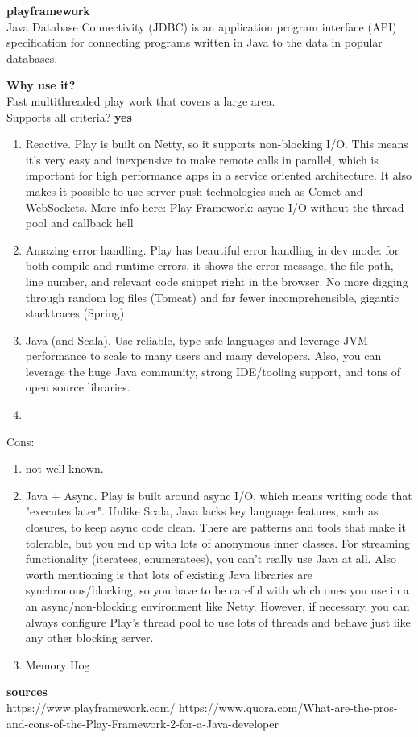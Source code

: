 
\textbf{playframework} \\
Java Database Connectivity (JDBC) is an application program interface (API) specification for connecting programs written in Java to the data in popular databases.

\textbf{Why use it?} \\
Fast multithreaded play work that covers a large area.\\

Supports all criteria?
\textbf{yes}

\begin{enumerate}
	\item Reactive. Play is built on Netty, so it supports non-blocking I/O. This means it's very easy and inexpensive to make remote calls in parallel, which is important for high performance apps in a service oriented architecture. It also makes it possible to use server push technologies such as Comet and WebSockets. More info here: Play Framework: async I/O without the thread pool and callback hell 
	\item Amazing error handling. Play has beautiful error handling in dev mode: for both compile and runtime errors, it shows the error message, the file path, line number, and relevant code snippet right in the browser. No more digging through random log files (Tomcat) and far fewer incomprehensible, gigantic stacktraces (Spring).
	\item Java (and Scala). Use reliable, type-safe languages and leverage JVM performance to scale to many users and many developers. Also, you can leverage the huge Java community, strong IDE/tooling support, and tons of open source libraries.
	\item 
\end{enumerate}
Cons:
\begin{enumerate}
	\item not well known.
	\item Java + Async. Play is built around async I/O, which means writing code that "executes later". Unlike Scala, Java lacks key language features, such as closures, to keep async code clean. There are patterns and tools that make it tolerable, but you end up with lots of anonymous inner classes. For streaming functionality (iteratees, enumeratees), you can't really use Java at all. Also worth mentioning is that lots of existing Java libraries are synchronous/blocking, so you have to be careful with which ones you use in a an async/non-blocking environment like Netty. However, if necessary, you can always configure Play's thread pool to use lots of threads and behave just like any other blocking server.
	\item Memory Hog
\end{enumerate}

\textbf{sources} \\
https://www.playframework.com/
https://www.quora.com/What-are-the-pros-and-cons-of-the-Play-Framework-2-for-a-Java-developer